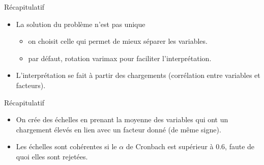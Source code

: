 \documentclass[
  ignorenonframetext,
]{beamer}
\providecommand{\tightlist}{%
  \setlength{\itemsep}{0pt}\setlength{\parskip}{0pt}}\usepackage{longtable,booktabs,array}
\begin{document}
\begin{frame}{Récapitulatif}
\protect\hypertarget{ruxe9capitulatif-3}{}
\begin{itemize}
\tightlist
\item
  La solution du problème n'est pas unique

  \begin{itemize}
  \tightlist
  \item
    on choisit celle qui permet de mieux séparer les variables.
  \item
    par défaut, rotation varimax pour faciliter l'interprétation.
  \end{itemize}
\item
  L'interprétation se fait à partir des chargements (corrélation entre
  variables et facteurs).
\end{itemize}
\end{frame}

\begin{frame}{Récapitulatif}
\protect\hypertarget{ruxe9capitulatif-4}{}
\begin{itemize}
\tightlist
\item
  On crée des échelles en prenant la moyenne des variables qui ont un
  chargement élevés en lien avec un facteur donné (de même signe).
\item
  Les échelles sont cohérentes si le \(\alpha\) de Cronbach est
  supérieur à 0.6, faute de quoi elles sont rejetées.
\end{itemize}
\end{frame}
\end{document}
